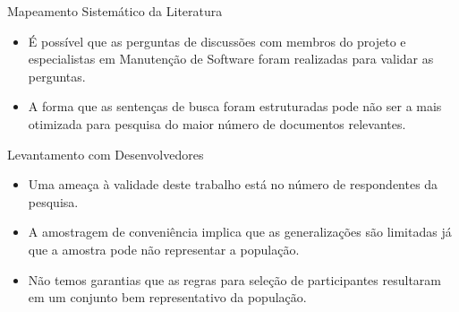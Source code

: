 \documentclass[t,14pt,mathserif]{beamer}
\begin{document}
\begin{frame}{Mapeamento Sistemático da Literatura}
    \begin{itemize}

        \item É possível que as perguntas de discussões com membros do projeto e
            especialistas em Manutenção de Software foram realizadas para
            validar as perguntas.

        \item A forma que as sentenças de busca foram estruturadas pode não ser
            a mais otimizada para pesquisa do maior número de documentos
            relevantes.
    \end{itemize}
\end{frame}

\begin{frame}{Levantamento com Desenvolvedores}

    \begin{itemize}
        \item Uma ameaça à validade deste trabalho está no número de
            respondentes da pesquisa.
        \item A amostragem de conveniência implica que as generalizações são
            limitadas já que a amostra pode não representar a população.
        \item Não temos garantias que as regras para seleção de participantes
             resultaram em um conjunto bem representativo da população.
     \end{itemize}

\end{frame}
\end{document}
